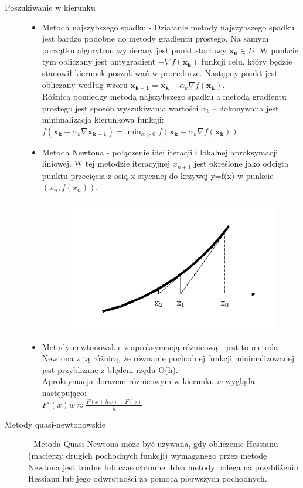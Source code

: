 \begin{description}
    \item[Poszukiwanie w kierunku]\mbox{}
    \begin{itemize}
        \item Metoda najszybszego spadku - Działanie metody najszybszego spadku jest bardzo podobne do metody gradientu prostego. Na samym początku algorytmu wybierany jest punkt startowy $\mathbf {x_{0}} \in D$. W punkcie tym obliczany jest antygradient $-\nabla f(\mathbf {x_{k}} )$ funkcji celu, który będzie stanowił kierunek poszukiwań w procedurze. Następny punkt jest obliczany według wzoru $\mathbf{x_{k+1}} = \mathbf{x_{k}}-\alpha_k\nabla f(\mathbf{x_{k}})$.\\Różnicą pomiędzy metodą najszybszego spadku a metodą gradientu prostego jest sposób wyszukiwania wartości $\alpha_{k}$ – dokonywana jest minimalizacja kierunkowa funkcji:\\ $f(\mathbf{x_{k}}-\alpha_k\nabla\mathbf{x_{k+1}}) = \min_{\alpha>0} f( \mathbf{x_{k}}-\alpha_k\nabla f(\mathbf{x_{k}}))$
        \item Metoda Newtona - połączenie idei iteracji i lokalnej aproksymacji liniowej. W tej metodzie iteracyjnej $x_{n+1}$ jest określone jako odcięta punktu przecięcia z osią x stycznej do krzywej y=f(x) w punkcie $(x_n,f(x_n))$.\\
        \begin{figure}[H]
        \centering
        \includegraphics[width=0.5\linewidth]{fig/Metoda Newtona.png}
        \end{figure}
        \item Metody newtonowskie z aproksymacją różnicową - jest to metoda Newtona z tą różnicą, że równanie pochodnej funkcji minimalizowanej jest przybliżane z błędem rzędu O(h).\\ Aproksymacja ilorazem różnicowym w kierunku $w$ wygląda następująco:\\
        $F'(x)w\approx\frac{F(x+hw)-F(x)}{h}$
    \end{itemize}
    \item[Metody quasi-newtonowskie] - Metoda Quasi-Newtona może być używana, gdy obliczenie Hessianu (macierzy drugich pochodnych funkcji) wymaganego przez metodę Newtona jest trudne lub czasochłonne. Idea metody polega na przybliżeniu Hessianu lub jego odwrotności za pomocą pierwszych pochodnych.

\end{description}

